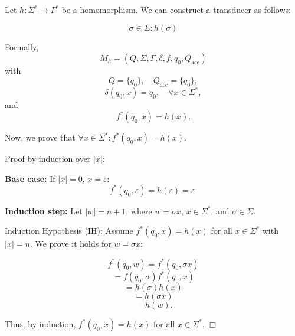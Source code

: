 Let \( h: \Sigma^* \to \Gamma^* \) be a homomorphism.  
We can construct a transducer as follows:

\[
\sigma \in \Sigma: h(\sigma)
\]

Formally, 
\[
M_h = (Q, \Sigma, \Gamma, \delta, f, q_0, Q_{\text{acc}})
\]
with
\[
Q = \{ q_0 \}, \quad Q_{\text{acc}} = \{ q_0 \},
\]
\[
\delta(q_0, x) = q_0, \quad \forall x \in \Sigma^*,
\]
and
\[
f^*(q_0, x) = h(x).
\]

Now, we prove that \( \forall x \in \Sigma^* : f^*(q_0, x) = h(x) \).

Proof by induction over \( |x| \):  

\textbf{Base case:}  
If \( |x| = 0 \), \( x = \varepsilon \):  
\[
f^*(q_0, \varepsilon) = h(\varepsilon) = \varepsilon.
\]

\textbf{Induction step:}  
Let \( |w| = n + 1 \), where \( w = \sigma x \), \( x \in \Sigma^* \), and \( \sigma \in \Sigma \).

Induction Hypothesis (IH): Assume \( f^*(q_0, x) = h(x) \) for all \( x \in \Sigma^* \) with \( |x| = n \).  
We prove it holds for \( w = \sigma x \):  

\[
f^*(q_0, w) = f^*(q_0, \sigma x)
\]
\[
= f(q_0, \sigma) f^*(q_0, x)
\]
\[
= h(\sigma) h(x)
\]
\[
= h(\sigma x)
\]
\[
= h(w).
\]

Thus, by induction, \( f^*(q_0, x) = h(x) \) for all \( x \in \Sigma^* \). \(\Box\)




